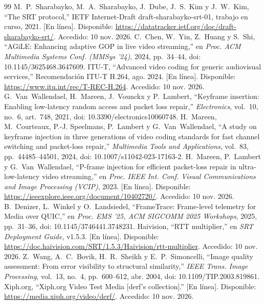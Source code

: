 \documentclass[10pt,twocolumn,letterpaper]{article}
\begin{document}
\begin{thebibliography}{99}
\footnotesize
\setlength{\itemsep}{1pt}
 M.~P.~Sharabayko, M.~A.~Sharabayko, J.~Dube, J.~S.~Kim y J.~W.~Kim, ``The SRT protocol,'' IETF Internet-Draft draft-sharabayko-srt-01, trabajo en curso, 2021. [En línea]. Disponible: \url{https://datatracker.ietf.org/doc/draft-sharabayko-srt/}. Accedido: 10 nov. 2026.
 C.~Chen, W.~Yin, Z.~Huang y S.~Shi, ``AGiLE: Enhancing adaptive GOP in live video streaming,'' en \emph{Proc. ACM Multimedia Systems Conf. (MMSys '24)}, 2024, pp.~34--44, doi: 10.1145/3625468.3647609.
 ITU-T, ``Advanced video coding for generic audiovisual services,'' Recomendación ITU-T H.264, ago. 2024. [En línea]. Disponible: \url{https://www.itu.int/rec/T-REC-H.264}. Accedido: 10 nov. 2026.
 G.~Van~Wallendael, H.~Mareen, J.~Vounckx y P.~Lambert, ``Keyframe insertion: Enabling low-latency random access and packet loss repair,'' \emph{Electronics}, vol.~10, no.~6, art.~748, 2021, doi: 10.3390/electronics10060748.
 H.~Mareen, M.~Courteaux, P.-J. Speelmans, P.~Lambert y G.~Van~Wallendael, ``A study on keyframe injection in three generations of video coding standards for fast channel switching and packet-loss repair,'' \emph{Multimedia Tools and Applications}, vol.~83, pp.~44485--44501, 2024, doi: 10.1007/s11042-023-17163-2.
 H.~Mareen, P.~Lambert y G.~Van~Wallendael, ``P-frame injection for efficient packet-loss repair in ultra-low-latency video streaming,'' en \emph{Proc. IEEE Int. Conf. Visual Communications and Image Processing (VCIP)}, 2023. [En línea]. Disponible: \url{https://ieeexplore.ieee.org/document/10402720/}. Accedido: 10 nov. 2026.
 B.~Denizer, L.~Winkel y O.~Landsiedel, ``FrameTrace: Frame-level telemetry for Media over QUIC,'' en \emph{Proc. EMS '25, ACM SIGCOMM 2025 Workshops}, 2025, pp.~31--36, doi: 10.1145/3746441.3748231.
 Haivision, ``RTT multiplier,'' en \emph{SRT Deployment Guide}, v1.5.3. [En línea]. Disponible: \url{https://doc.haivision.com/SRT/1.5.3/Haivision/rtt-multiplier}. Accedido: 10 nov. 2026.
 Z.~Wang, A.~C.~Bovik, H.~R.~Sheikh y E.~P.~Simoncelli, ``Image quality assessment: From error visibility to structural similarity,'' \emph{IEEE Trans. Image Processing}, vol.~13, no.~4, pp.~600--612, abr. 2004, doi: 10.1109/TIP.2003.819861.
 Xiph.org, ``Xiph.org Video Test Media [derf's collection].'' [En línea]. Disponible: \url{https://media.xiph.org/video/derf/}. Accedido: 10 nov. 2026.
\end{thebibliography}
\end{document}
